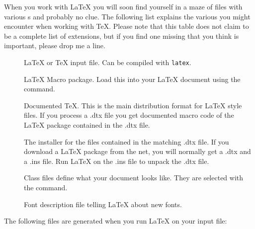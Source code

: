 When you work with \LaTeX{} you will soon find yourself in a maze of
files with various s and probably no clue. The following
list explains the various  you might encounter when
working with \TeX{}. Please note that this table does not claim to be
a complete list of extensions, but if you find one missing that you
think is important, please drop me a line.

\begin{description}

\item[] \LaTeX{} or \TeX{} input file. Can be compiled with
  \texttt{latex}.
\item[] \LaTeX{} Macro package. Load this
  into your \LaTeX{} document using the  command.
\item[] Documented \TeX{}. This is the main distribution
  format for \LaTeX{} style files. If you process a .dtx file you get
  documented macro code of the \LaTeX{} package contained in the .dtx
  file.
\item[] The installer for the files contained in the
  matching .dtx file. If you download a \LaTeX{} package from the net,
  you will normally get a .dtx and a .ins file. Run \LaTeX{} on the
  .ins file to unpack the .dtx file.
\item[] Class files define what your document looks
  like. They are selected with the  command.
\item[] Font description file telling  \LaTeX{} about new fonts.
\end{description}
The following files are generated when you run \LaTeX{} on your input
file:

